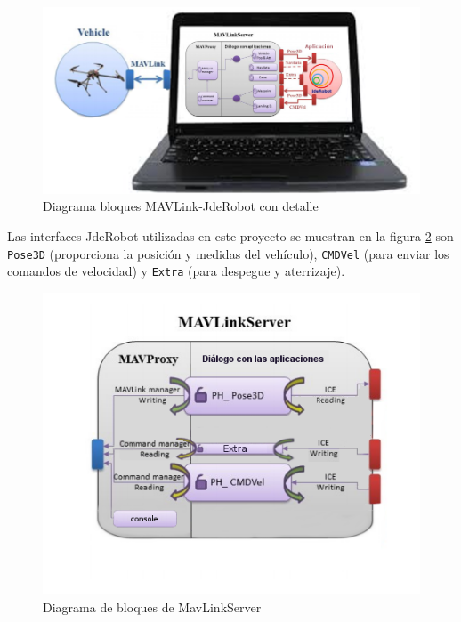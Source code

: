 \begin{figure}[H]
  \centering 
  \hspace*{-2.5cm}     
  \includegraphics[scale=0.45]{imagenes/cajaTransparente.png}
  \caption{Diagrama bloques MAVLink-JdeRobot con detalle}
  \label{fig:mavLinkJdeRobotTrasparente}
\end{figure}

Las interfaces JdeRobot utilizadas en este proyecto se muestran en la figura \ref{fig:MavProxyInside} son \texttt{Pose3D} (proporciona la posición y medidas del vehículo), \texttt{CMDVel} (para enviar los comandos de velocidad) y \texttt{Extra} (para despegue y aterrizaje).

\begin{figure}[H]
  \centering
  \includegraphics[scale=0.45]{imagenes/MavProxyPorDentro.png}
  \caption{Diagrama de bloques de MavLinkServer}
  \label{fig:MavProxyInside}
\end{figure}



